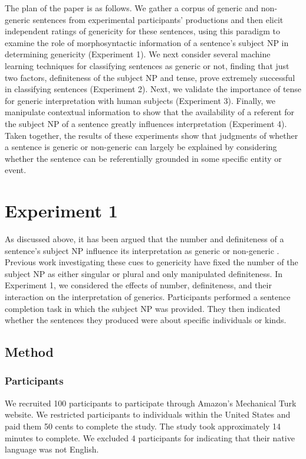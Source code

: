 \documentclass[10pt,letterpaper]{article}
\begin{document}
The plan of the paper is as follows. We gather a corpus of generic and non-generic sentences from experimental participants' productions and then elicit independent ratings of genericity for these sentences, using this paradigm to examine the role of morphosyntactic information of a sentence's subject NP in determining genericity (Experiment 1). We next consider several machine learning techniques for classifying sentences as generic or not, finding that just two factors, definiteness of the subject NP and tense, prove extremely successful in classifying sentences (Experiment 2). Next, we validate the importance of tense for generic interpretation with human subjects (Experiment 3). Finally, we manipulate contextual information to show that the availability of a referent for the subject NP of a sentence greatly influences interpretation (Experiment 4). Taken together, the results of these experiments show that judgments of whether a sentence is generic or non-generic can largely be explained by considering whether the sentence can be referentially grounded in some specific entity or event.

\section{Experiment 1}

As discussed above, it has been argued that the number and definiteness of a sentence's subject NP influence its interpretation as generic or non-generic \cite{Carlson:1977,Krifka:1995,Lyons:1977}. Previous work investigating these cues to genericity have fixed the number of the subject NP as either singular \cite{Cimpian:2011} or plural \cite{Gelman:2003} and only manipulated definiteness. In Experiment 1, we considered the effects of number, definiteness, and their interaction on the interpretation of generics. Participants performed a sentence completion task in which the subject NP was provided. They then indicated whether the sentences they produced were about specific individuals or kinds.

\subsection{Method}

\subsubsection{Participants}

We recruited 100 participants to participate through Amazon's Mechanical Turk website. We restricted participants to individuals within the United States and paid them 50 cents to complete the study. The study took approximately 14 minutes to complete. We excluded 4 participants for indicating that their native language was not English.
\end{document}
